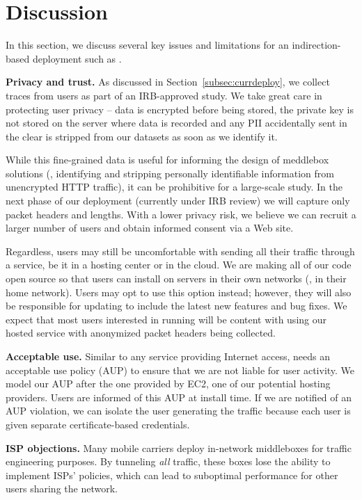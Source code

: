 \section{Discussion}
\label{sec:discussion}
In this section, we discuss several key issues and limitations for an indirection-based 
deployment such as \meddle.
 
\noindent\textbf{Privacy and trust.} As discussed in Section~\ref{subsec:currdeploy}, we 
collect traces from users as part of an IRB-approved study. We take great care in 
protecting user privacy -- data is encrypted before being stored, the private key is 
not stored on the server where data is recorded and any PII accidentally sent in the 
clear is stripped from our datasets as soon as we identify it. 

While this fine-grained data is useful for informing the design of meddlebox solutions (\eg, 
identifying and stripping personally identifiable information from unencrypted 
HTTP traffic), it can be prohibitive for a large-scale study. In the next phase of 
our deployment (currently under IRB review) we will capture only packet headers 
and lengths. With a lower privacy risk, we believe we can recruit a larger number 
of users and obtain informed consent via a Web site. 

Regardless, users may still be uncomfortable with sending all their traffic through a 
\meddle service, be it in a hosting center or in the cloud. We are making all of 
our code open source so that users can install \meddle on servers in their 
own networks (\eg, in their home network). Users may opt to use this option instead; however, they will also be responsible 
for updating \meddle to include the latest new features and bug fixes. We expect 
that most users interested in running \meddle will be content with using our hosted 
\meddle service with anonymized packet headers being collected. 

\noindent\textbf{Acceptable use.} Similar to any service providing Internet access, 
\meddle needs an acceptable use policy (AUP) to ensure that we are not liable for 
user activity. We model our AUP after the one provided by EC2, one of our potential 
hosting providers. Users are informed of this AUP at install time. If we are notified 
of an AUP violation, we can isolate the user generating the traffic because each 
user is given separate certificate-based credentials.

\noindent\textbf{ISP objections.} Many mobile carriers deploy in-network middleboxes 
for traffic engineering purposes. By tunneling \emph{all} traffic, these boxes lose the 
ability to implement ISPs' policies, which can lead to suboptimal performance for 
other users sharing the network. 

